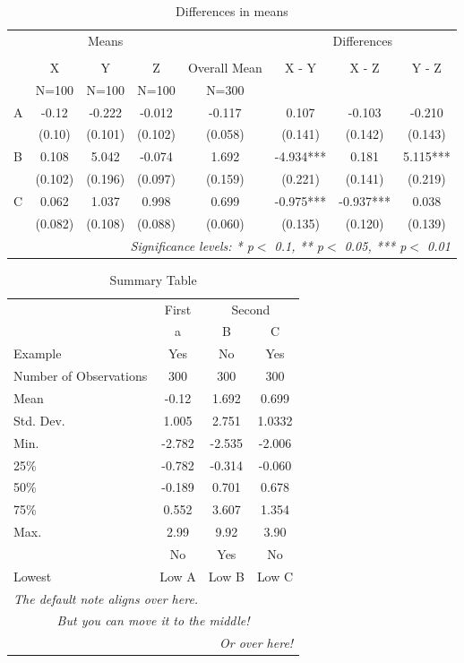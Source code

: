 \begin{table}[!htbp]
  \centering
  \caption{Differences in means}
  \label{table:differencesinmeans}
\begin{tabular}{lccccccc}
  \toprule
   & \multicolumn{3}{c}{Means} & \multicolumn{1}{c}{} & \multicolumn{3}{c}{Differences} \\
  \cline{2-4}\cline{6-8}\\

   & X & Y & Z & Overall Mean & X - Y & X - Z & Y - Z\\
   & N=100 & N=100 & N=100 & N=300 &  &  & \\
  \midrule
  A & -0.12 & -0.222 & -0.012 & -0.117 & 0.107 & -0.103 & -0.210 \\
   & (0.10) & (0.101) & (0.102) & (0.058) & (0.141) & (0.142) & (0.143) \\
  B & 0.108 & 5.042 & -0.074 & 1.692 & -4.934*** & 0.181 & 5.115*** \\
   & (0.102) & (0.196) & (0.097) & (0.159) & (0.221) & (0.141) & (0.219) \\
  C & 0.062 & 1.037 & 0.998 & 0.699 & -0.975*** & -0.937*** & 0.038 \\
   & (0.082) & (0.108) & (0.088) & (0.060) & (0.135) & (0.120) & (0.139) \\
  \bottomrule
  \multicolumn{8}{r}{{\small \textit{Significance levels: * p$<$ 0.1, ** p$<$ 0.05, *** p$<$ 0.01}}}\\
\end{tabular}
\end{table}
\begin{table}[!htbp]
  \centering
\begin{tabular}{lccc}
  \toprule
   & \multicolumn{1}{c}{First} & \multicolumn{2}{c}{Second} \\
   & a & B & C\\
  Example & Yes & No & Yes\\
  \midrule
  Number of Observations & 300 & 300 & 300 \\
  Mean & -0.12 & 1.692 & 0.699 \\
  Std. Dev. & 1.005 & 2.751 & 1.0332 \\
  Min. & -2.782 & -2.535 & -2.006 \\
  25\% & -0.782 & -0.314 & -0.060 \\
  50\% & -0.189 & 0.701 & 0.678 \\
  75\% & 0.552 & 3.607 & 1.354 \\
  Max. & 2.99 & 9.92 & 3.90 \\
   & No & Yes & No\\
  \bottomrule
  Lowest & Low A & Low B & Low C\\
  \bottomrule
  \multicolumn{4}{l}{{\small \textit{The default note aligns over here.}}}\\
  \multicolumn{4}{c}{{\small \textit{But you can move it to the middle!}}}\\
  \multicolumn{4}{r}{{\small \textit{Or over here!}}}\\
\end{tabular}
  \caption{Summary Table}
  \label{table:summarytable}
\end{table}

